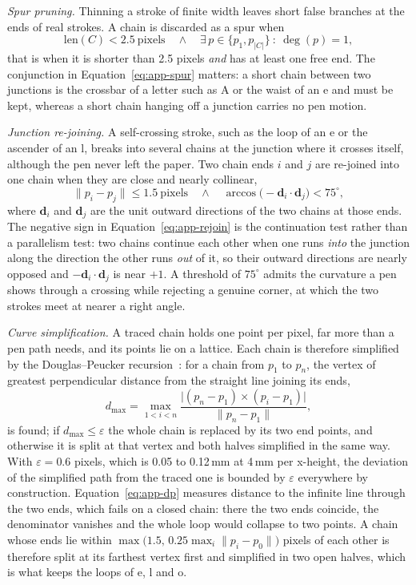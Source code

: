 \emph{Spur pruning.}
Thinning a stroke of finite width leaves short false branches at the ends of real strokes.
A chain is discarded as a spur when
\begin{equation}
\mathrm{len}(C)<2.5\ \text{pixels}\quad\wedge\quad \exists\,p\in\{p_1,p_{|C|}\}\ :\ \deg(p)=1,
\label{eq:app-spur}
\end{equation}
that is when it is shorter than 2.5 pixels \emph{and} has at least one free end.
The conjunction in Equation~\ref{eq:app-spur} matters: a short chain between two junctions is the crossbar of a letter such as A or the waist of an e and must be kept, whereas a short chain hanging off a junction carries no pen motion.

\emph{Junction re-joining.}
A self-crossing stroke, such as the loop of an e or the ascender of an l, breaks into several chains at the junction where it crosses itself, although the pen never left the paper.
Two chain ends $i$ and $j$ are re-joined into one chain when they are close and nearly collinear,
\begin{equation}
\lVert p_i-p_j\rVert\le1.5\ \text{pixels}\quad\wedge\quad \arccos\bigl(-\mathbf d_i\cdot\mathbf d_j\bigr)<75^\circ,
\label{eq:app-rejoin}
\end{equation}
where $\mathbf d_i$ and $\mathbf d_j$ are the unit outward directions of the two chains at those ends.
The negative sign in Equation~\ref{eq:app-rejoin} is the continuation test rather than a parallelism test: two chains continue each other when one runs \emph{into} the junction along the direction the other runs \emph{out} of it, so their outward directions are nearly opposed and $-\mathbf d_i\cdot\mathbf d_j$ is near $+1$.
A threshold of $75^\circ$ admits the curvature a pen shows through a crossing while rejecting a genuine corner, at which the two strokes meet at nearer a right angle.

\emph{Curve simplification.}
A traced chain holds one point per pixel, far more than a pen path needs, and its points lie on a lattice.
Each chain is therefore simplified by the Douglas--Peucker recursion~\cite{teikari2016}: for a chain from $p_1$ to $p_n$, the vertex of greatest perpendicular distance from the straight line joining its ends,
\begin{equation}
d_{\max}=\max_{1<i<n}\frac{\bigl\lvert(p_n-p_1)\times(p_i-p_1)\bigr\rvert}{\lVert p_n-p_1\rVert},
\label{eq:app-dp}
\end{equation}
is found; if $d_{\max}\le\varepsilon$ the whole chain is replaced by its two end points, and otherwise it is split at that vertex and both halves simplified in the same way.
With $\varepsilon=0.6$ pixels, which is 0.05 to 0.12\,mm at 4\,mm per x-height, the deviation of the simplified path from the traced one is bounded by $\varepsilon$ everywhere by construction.
Equation~\ref{eq:app-dp} measures distance to the infinite line through the two ends, which fails on a closed chain: there the two ends coincide, the denominator vanishes and the whole loop would collapse to two points.
A chain whose ends lie within $\max\bigl(1.5,\,0.25\max_i\lVert p_i-p_0\rVert\bigr)$ pixels of each other is therefore split at its farthest vertex first and simplified in two open halves, which is what keeps the loops of e, l and o.

